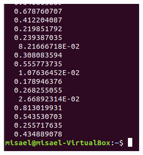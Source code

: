 \documentclass[12pt,a4paper]{article}
\begin{document}
\begin{enumerate}
    \begin{figure}[h!]
        \centering
        \includegraphics[scale=0.6]{3.8.PNG}
    \end{figure}
\end{enumerate}
\end{document}
